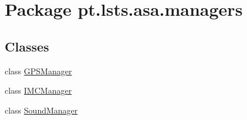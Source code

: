 \hypertarget{namespacept_1_1lsts_1_1asa_1_1managers}{}\section{Package pt.\+lsts.\+asa.\+managers}
\label{namespacept_1_1lsts_1_1asa_1_1managers}
\subsection*{Classes}
\begin{DoxyCompactItemize}
\item 
class \hyperlink{classpt_1_1lsts_1_1asa_1_1managers_1_1GPSManager}{G\+P\+S\+Manager}
\item 
class \hyperlink{classpt_1_1lsts_1_1asa_1_1managers_1_1IMCManager}{I\+M\+C\+Manager}
\item 
class \hyperlink{classpt_1_1lsts_1_1asa_1_1managers_1_1SoundManager}{Sound\+Manager}
\end{DoxyCompactItemize}
